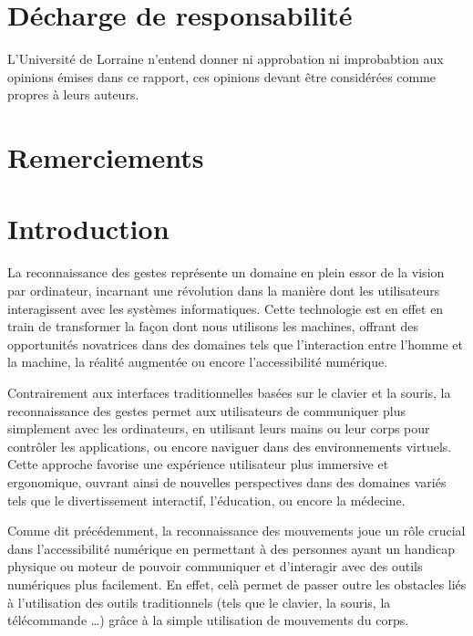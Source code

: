 \documentclass[11pt]{article}
\begin{document}
\newpage \newpage
\section*{Décharge de responsabilité }\bigbreak
L'Université de Lorraine n'entend donner ni approbation  ni improbabtion aux opinions émises dans ce rapport,
ces opinions devant être considérées comme propres à leurs auteurs. \bigbreak

\newpage
\section*{Remerciements}

\newpage
\tableofcontents
\newpage

\setcounter{page}{1}
\section*{Introduction}
La reconnaissance des gestes représente un domaine en plein essor de la vision par ordinateur, incarnant une révolution dans la manière dont les
utilisateurs interagissent avec les systèmes informatiques. Cette technologie est en effet en train de transformer la façon dont nous utilisons les machines,
offrant des opportunités novatrices dans des domaines tels que l'interaction entre l'homme et la machine, 
la réalité augmentée ou encore l'accessibilité numérique. \bigbreak 

Contrairement aux interfaces traditionnelles basées sur le clavier et la souris, la reconnaissance des gestes permet aux utilisateurs de 
communiquer plus simplement avec les ordinateurs, en utilisant leurs mains ou leur corps pour contrôler les applications, 
ou encore naviguer dans des environnements virtuels. Cette approche favorise une expérience utilisateur plus immersive 
et ergonomique, ouvrant ainsi de nouvelles perspectives dans des domaines variés tels que le divertissement interactif, l'éducation, ou encore la médecine. \bigbreak

Comme dit précédemment, la reconnaissance des mouvements joue un rôle crucial dans l’accessibilité numérique en permettant à des personnes ayant un handicap physique 
ou moteur de pouvoir communiquer et d'interagir avec des outils numériques plus facilement. En effet, celà permet de passer outre les obstacles liés à 
l’utilisation des outils traditionnels (tels que le clavier, la souris, la télécommande …) grâce à la simple utilisation de mouvements du corps. \bigbreak
\end{document}
